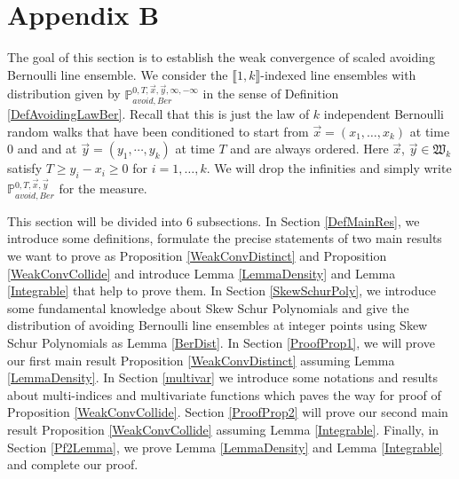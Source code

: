 %
\section{Appendix B} \label{Appendix2}

The goal of this section is to establish the weak convergence of scaled avoiding Bernoulli line ensemble. We consider the $\llbracket 1,k\rrbracket$-indexed line ensembles with distribution given by $\mathbb{P}^{0,T,\vec{x},\vec{y},\infty,-\infty}_{avoid,Ber}$ in the sense of Definition \ref{DefAvoidingLawBer}. Recall that this is just the law of $k$ independent Bernoulli random walks that have been conditioned to start from $\vec{x}=(x_{1},\dots,x_{k})$ at time $0$ and and at $\vec{y}=(y_1,\cdots,y_{k})$ at time $T$ and are always ordered. Here $\vec{x}$, $\vec{y}\in\mathfrak{W}_{k}$ satisfy $T\geq y_{i}-x_{i}\geq 0$ for $i=1,\dots,k$. We will drop the infinities and simply write $\mathbb{P}^{0,T,\vec{x},\vec{y}}_{avoid,Ber}$ for the measure.

This section will be divided into $6$ subsections. In Section \ref{DefMainRes}, we introduce some definitions, formulate the precise statements of two main results we want to prove as Proposition \ref{WeakConvDistinct} and Proposition \ref{WeakConvCollide} and introduce Lemma \ref{LemmaDensity} and Lemma \ref{Integrable} that help to prove them. In Section \ref{SkewSchurPoly}, we introduce some fundamental knowledge about Skew Schur Polynomials and give the distribution of avoiding Bernoulli line ensembles at integer points using Skew Schur Polynomials as Lemma \ref{BerDist}. In Section \ref{ProofProp1}, we will prove our first main result Proposition \ref{WeakConvDistinct} assuming Lemma \ref{LemmaDensity}. In Section \ref{multivar} we introduce some notations and results about multi-indices and multivariate functions which paves the way for proof of Proposition \ref{WeakConvCollide}. Section \ref{ProofProp2} will prove our second main result Proposition \ref{WeakConvCollide} assuming Lemma \ref{Integrable}. Finally, in Section \ref{Pf2Lemma}, we prove Lemma \ref{LemmaDensity} and Lemma \ref{Integrable} and complete our proof.

